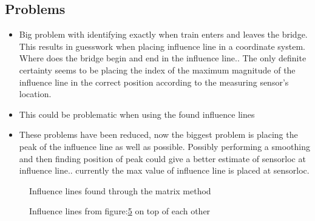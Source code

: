 \subsection{Problems}
\begin{itemize}
\item Big problem with identifying exactly when train enters and leaves the bridge. This results in guesswork when placing influence line in a coordinate system. Where does the bridge begin and end in the influence line.. The only definite certainty seems to be placing the index of the maximum magnitude of the influence line in the correct position according to the measuring sensor's location.
\item This could be problematic when using the found influence lines
\item These problems have been reduced, now the biggest problem is placing the peak of the influence line as well as possible. Possibly performing a smoothing and then finding position of peak could give a better estimate of sensorloc at influence line.. currently the max value of influence line is placed at sensorloc.
\end{itemize}
\begin{figure}[H]
\centering
\begin{subfigure}[t]{0.45\textwidth}
	\centering
	
	\label{fig:train3}
\end{subfigure}
\qquad
\begin{subfigure}[t]{0.45\textwidth}
	\centering
	
	\label{fig:train4}
\end{subfigure}

\begin{subfigure}[t]{0.45\textwidth}
	\centering
	
	\label{fig:train5}
\end{subfigure}
\qquad
\begin{subfigure}[t]{0.45\textwidth}
	\centering
	
	\label{fig:train8}
\end{subfigure}
\caption{Influence lines found through the matrix method}\label{fig:infl_trains}
\end{figure}

\begin{figure}[H]
\centering

\caption{Influence lines from figure:\ref{fig:infl_trains} on top of each other}\label{fig:infl_all_trains}
\end{figure}


